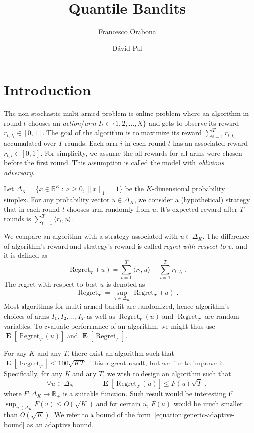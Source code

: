 \documentclass{article}
\newcommand{\R}{\mathbb{R}}
\newcommand{\norm}[1]{\|#1\|}
\DeclareMathOperator{\Regret}{Regret}
\DeclareMathOperator{\Exp}{\mathbf{E}}
\begin{document}
\title{Quantile Bandits}
\author{Francesco Orabona \and D\'avid P\'al}

\maketitle

\section{Introduction}

The non-stochastic multi-armed problem is online problem where an algorithm in
round $t$ chooses an \emph{action}/\emph{arm} $I_t \in \{1,2,\dots,K\}$ and
gets to observe its reward $r_{t,I_t} \in [0,1]$. The goal of the algorithm is
to maximize its reward $\sum_{t=1}^T r_{t,I_t}$ accumulated over $T$ rounds.
Each arm $i$ in each round $t$ has an associated reward $r_{t,i} \in [0,1]$.
For simplicity, we assume the all rewards for all arms were chosen before the
first round. This assumption is called the model with \emph{oblivious
adversary}.

Let $\Delta_K = \{ x \in \R^K ~:~ x \ge 0, \norm{x}_1 = 1 \}$ be the
$K$-dimensional probability simplex. For any probability vector $u \in
\Delta_K$, we consider a (hypothetical) strategy that in each round $t$ chooses
arm randomly from $u$. It's expected reward after $T$ rounds is $\sum_{t=1}^T
\langle r_t, u \rangle$.

We compare an algorithm with a strategy associated with $u \in \Delta_K$.
The difference of algorithm's reward and strategy's reward is called \emph{regret
with respect to $u$}, and it is defined as
$$
\Regret_T(u) = \sum_{t=1}^T \langle r_t, u \rangle - \sum_{t=1}^T r_{t,I_t} \; .
$$
The regret with respect to best $u$ is denoted as
$$
\Regret_T =  \sup_{u \in \Delta_K} \Regret_T(u) \; .
$$
Most algorithms for multi-armed bandit are randomized, hence algorithm's
choices of arms $I_1, I_2, \dots, I_T$ as well as $\Regret_T(u)$ and
$\Regret_T$ are random variables. To evaluate performance of an algorithm,
we might thus use $\Exp[\Regret_T(u)]$ and $\Exp[\Regret_T]$.

For any $K$ and any $T$, there exist an algorithm such that $\Exp[\Regret_T] \le
100 \sqrt{KT}$. This a great result, but we like to improve it. Specifically,
for any $K$ and any $T$, we wish to design an algorithm such that
\begin{equation}
\label{equation:generic-adaptive-bound}
\forall u \in \Delta_N \qquad \qquad \Exp[\Regret_T(u)] \le F(u) \sqrt{T} \; ,
\end{equation}
where $F:\Delta_K \to \R_+$ is a suitable function. Such result would be
interesting if $\sup_{u \in \Delta_K} F(u) \le O(\sqrt{K})$ and for certain
$u$, $F(u)$ would be much smaller than $O(\sqrt{K})$. We refer to a bound of the
form~\eqref{equation:generic-adaptive-bound} as an adaptive bound.
\end{document}
